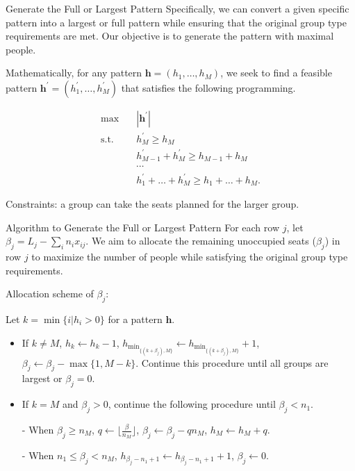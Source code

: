   \begin{frame}{Generate the Full or Largest Pattern}
    Specifically, we can convert a given specific pattern into a largest or full pattern while ensuring that the original group type requirements are met. Our objective is to generate the pattern with maximal people.

    Mathematically, for any pattern $\bm{h} = (h_1, \ldots, h_M)$, we seek to find a feasible pattern $\bm{h}^{'} = (h_1^{'}, \ldots, h_M^{'})$ that satisfies the following programming.

    \begin{equation*}\label{full_largest}
      \begin{aligned}
      \max \quad & |\bm{h}^{'}| \\
      \text {s.t.} \quad & h_M^{'} \geq h_M \\
      &  h_{M-1}^{'} + h_M^{'} \geq h_{M-1} + h_M \\
      & \cdots \\
      & h_1^{'} + \ldots + h_M^{'} \geq h_1 + \ldots + h_M.
      \end{aligned}
    \end{equation*}

    Constraints: a group can take the seats planned for the larger group.
  \end{frame}

  \begin{frame}{Algorithm to Generate the Full or Largest Pattern}
    For each row $j$, let $\beta_{j} = L_{j} - \sum_{i} n_{i} x_{ij}$. We aim to allocate the remaining unoccupied seats ($\beta_{j}$) in row $j$ to maximize the number of people while satisfying the original group type requirements.
    \vspace{0.5cm}
    
    Allocation scheme of $\beta_{j}$:
    \vspace{0.5cm}

    \begin{scriptsize}
      Let $k = \min\{i | h_i > 0\}$ for a pattern $\bm{h}$.

      \begin{itemize}
        \item If $k \neq M$, $h_{k} \gets h_{k} -1$, $h_{\min_{\{(k+\beta_{j}), M\}}} \gets h_{\min_{\{(k+\beta_{j}), M\}}} +1$, $\beta_{j} \gets \beta_{j} - \max\{1, M - k\}$. Continue this procedure until all groups are largest or $\beta_{j} =0$. 
        \item If $k = M$ and $\beta_{j} > 0$, continue the following procedure until $\beta_{j} < n_{1}$.
        \item[-] When $\beta_{j} \geq n_{M}$, $q \gets \lfloor\frac{\beta}{n_M}\rfloor$, $\beta_{j} \gets \beta_{j} - q n_M$, $h_{M} \gets h_{M} + q$.
        \item[-] When $n_{1} \leq \beta_{j} < n_{M}$, $h_{\beta_{j}-n_1+1} \gets h_{\beta_{j}-n_1+1} + 1$, $\beta_{j} \gets 0$.
      \end{itemize}  
    \end{scriptsize}
    
  \end{frame}